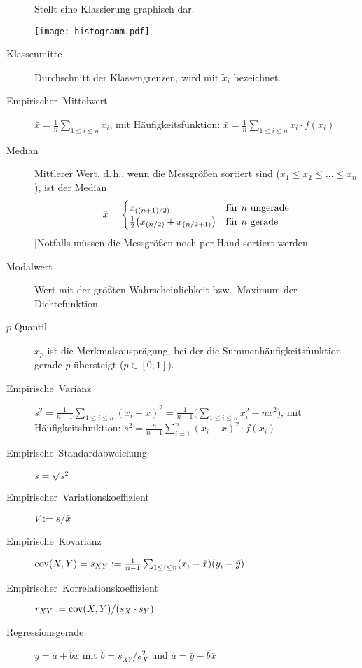 \begin{description}
	Stellt eine Klassierung graphisch dar.
	\begin{center}
	  \texttt{[image: histogramm.pdf]}
	\end{center}
  \item [{Klassenmitte}] 
	Durchschnitt der Klassengrenzen, wird mit $\tilde{x}_{i}$ bezeichnet.
  \item [{Empirischer~Mittelwert}]
	$\bar{x}=\frac{1}{n}\sum_{1 \leq i \leq n} x_i$, mit Häufigkeitsfunktion: $\bar{x} = \frac{1}{n}\sum_{1 \leq i \leq n} x_i\cdot f(x_i)$
  \item [{Median}] 
	Mittlerer Wert, d.\,h., wenn die Messgrößen sortiert sind%
	($x_{1}\leq x_{2}\leq\ldots\leq x_{n}$), ist der Median
	\[
	  \tilde{x}=\begin{cases}
	    x_{((n+1)/2)}                                   & \hbox{für $n$ ungerade}\\
	    \frac{1}{2} \bigl(x_{(n/2)} + x_{(n/2+1)}\bigr) & \hbox{für $n$ gerade}
	  \end{cases}
	\]
	[Notfalls müssen die Messgrößen noch per Hand sortiert werden.]

  \item [{Modalwert}] 
	Wert mit der größten Wahrscheinlichkeit bzw.~Maximum der Dichtefunktion.
  \item [{$p$-Quantil}] 
	$x_{p}$ ist die Merkmalsausprägung, bei der die Summenhäufigkeitsfunktion gerade $p$ übersteigt ($p\in[0;1]$).
  \item [{Empirische~Varianz}] 
	$s^2 = \frac{1}{n-1}\sum_{1 \leq i \leq n}(x_i-\bar{x})^2 = \frac{1}{n-1}\bigl(\sum_{1 \leq i \leq n} x_i^2 - n\bar{x}^{2}\bigr)$,
	mit Häufigkeitsfunktion: $s^2 = \frac{n}{n-1}\sum_{i=1}^{n}(x_i-\bar{x})^{2}\cdot f(x_{i})$
  \item [{Empirische~Standardabweichung}] 
	$s=\sqrt{s^2}$
  \item [{Empirischer~Variationskoeffizient}] 
	$V := s / \bar{x}$
  \item [{Empirische~Kovarianz}] 
	$\operatorname{cov}(X,Y) = s_{XY} := \frac{1}{n-1} \sum_{1 \leq i \leq n} (x_i - \bar{x})(y_i-\bar{y})$
  \item [{Empirischer~Korrelationskoeffizient}] 
	$r_{XY} := \operatorname{cov}(X,Y) / (s_X \cdot s_Y)$
  \item [{Regressionsgerade}] 
	$y = \hat{a}+\hat{b}x$ mit $\hat{b}=s_{XY} / s_{X}^{2}$ und $\hat{a} = \bar{y}-\hat{b}\bar{x}$
\end{description}

